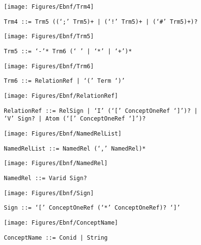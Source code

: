  \begin{figure}[H]
  \centering
  \texttt{[image: Figures/Ebnf/Trm4]}
  \caption*{\texttt{Trm4 \small::=  Trm5 ((`;' Trm5)+ | (`!' Trm5)+ | (`\#' Trm5)+)?}}
  \label{fig:ebnf-Trm4}
 \end{figure}

 \begin{figure}[H]
  \centering
  \texttt{[image: Figures/Ebnf/Trm5]}
  \caption*{\texttt{Trm5 \small::=  `-'* Trm6 (`~' | `*' | `+')*}}
  \label{fig:ebnf-Trm5}
 \end{figure}

 \begin{figure}[H]
  \centering
  \texttt{[image: Figures/Ebnf/Trm6]}
  \caption*{\texttt{Trm6 \small::=  RelationRef | `(' Term `)'}}
  \label{fig:ebnf-Trm6}
 \end{figure}

 \begin{figure}[H]
  \centering
  \texttt{[image: Figures/Ebnf/RelationRef]}
  \caption*{\texttt{RelationRef \small::=  RelSign | `I' (`[' ConceptOneRef `]')? | `V' Sign? | Atom (`[' ConceptOneRef `]')?}}
  \label{fig:ebnf-RelationRef}
 \end{figure}

 \begin{figure}[H]
  \centering
  \texttt{[image: Figures/Ebnf/NamedRelList]}
  \caption*{\texttt{NamedRelList \small::=  NamedRel (`,' NamedRel)*}}
  \label{fig:ebnf-NamedRelList}
 \end{figure}

 \begin{figure}[H]
  \centering
  \texttt{[image: Figures/Ebnf/NamedRel]}
  \caption*{\texttt{NamedRel \small::=  Varid Sign?}}
  \label{fig:ebnf-NamedRel}
 \end{figure}

 \begin{figure}[H]
  \centering
  \texttt{[image: Figures/Ebnf/Sign]}
  \caption*{\texttt{Sign \small::=  `[' ConceptOneRef (`*' ConceptOneRef)? `]'}}
  \label{fig:ebnf-Sign}
 \end{figure}

 \begin{figure}[H]
  \centering
  \texttt{[image: Figures/Ebnf/ConceptName]}
  \caption*{\texttt{ConceptName \small::=  Conid | String}}
  \label{fig:ebnf-ConceptName}
 \end{figure}

